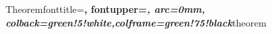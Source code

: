 
%
  {Theorem}{fonttitle=\bfseries\upshape, fontupper=\slshape,
     arc=0mm, colback=green!5!white,colframe=green!75!black}{theorem}






